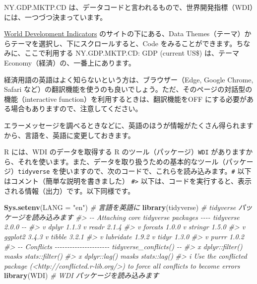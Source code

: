 \documentclass[
  xelatex, ja=standard]{bxjsbook}
\newenvironment{Shaded}{\begin{snugshade}}{\end{snugshade}}
\newcommand{\AttributeTok}[1]{\textcolor[rgb]{0.13,0.29,0.53}{#1}}
\newcommand{\CommentTok}[1]{\textcolor[rgb]{0.56,0.35,0.01}{\textit{#1}}}
\newcommand{\FunctionTok}[1]{\textcolor[rgb]{0.13,0.29,0.53}{\textbf{#1}}}
\newcommand{\NormalTok}[1]{#1}
\newcommand{\StringTok}[1]{\textcolor[rgb]{0.31,0.60,0.02}{#1}}
\theoremstyle{definition}
\theoremstyle{definition}
\theoremstyle{definition}
\theoremstyle{definition}
\theoremstyle{remark}
\begin{document}
NY.GDP.MKTP.CD は、データコードと言われるもので、世界開発指標（WDI）には、一つづつ決まっています。

\href{https://datatopics.worldbank.org/world-development-indicators/}{World Development Indicators} のサイトの下にある、Data Themes（テーマ）からテーマを選択し、下にスクロールすると、Code をみることができます。ちなみに、ここで利用する NY.GDP.MKTP.CD: GDP (current US\$) は、テーマ Economy（経済）の、一番上にあります。

経済用語の英語はよく知らないという方は、ブラウザー（Edge, Google Chrome, Safari など）の翻訳機能を使うのも良いでしょう。ただ、そのページの対話型の機能（interactive function）を利用するときは、翻訳機能をOFF にする必要がある場合もありますので、注意してください。

エラーメッセージを調べるときなどに、英語のほうが情報がたくさん得られますから、言語を、英語に変更しておきます。

R には、WDI のデータを取得する R のツール（パッケージ）\texttt{WDI} がありますから、それを使います。また、データを取り扱うための基本的なツール（パッケージ）\texttt{tidyverse} を使いますので、次のコードで、これらを読み込みます。\texttt{\#} 以下はコメント（簡単な説明を書きました） \texttt{\#\textgreater{}} 以下は、コードを実行すると、表示される情報（出力）です。以下同様です。

\begin{Shaded}
\begin{Highlighting}[]
\FunctionTok{Sys.setenv}\NormalTok{(}\AttributeTok{LANG =} \StringTok{"en"}\NormalTok{) }\CommentTok{\# 言語を英語に}
\FunctionTok{library}\NormalTok{(tidyverse)      }\CommentTok{\# tidyverse パッケージを読み込みます}
\CommentTok{\#\textgreater{} {-}{-} Attaching core tidyverse packages {-}{-}{-}{-} tidyverse 2.0.0 {-}{-}}
\CommentTok{\#\textgreater{} v dplyr     1.1.3     v readr     2.1.4}
\CommentTok{\#\textgreater{} v forcats   1.0.0     v stringr   1.5.0}
\CommentTok{\#\textgreater{} v ggplot2   3.4.3     v tibble    3.2.1}
\CommentTok{\#\textgreater{} v lubridate 1.9.2     v tidyr     1.3.0}
\CommentTok{\#\textgreater{} v purrr     1.0.2     }
\CommentTok{\#\textgreater{} {-}{-} Conflicts {-}{-}{-}{-}{-}{-}{-}{-}{-}{-}{-}{-}{-}{-}{-}{-}{-}{-}{-}{-}{-}{-} tidyverse\_conflicts() {-}{-}}
\CommentTok{\#\textgreater{} x dplyr::filter() masks stats::filter()}
\CommentTok{\#\textgreater{} x dplyr::lag()    masks stats::lag()}
\CommentTok{\#\textgreater{} i Use the conflicted package (\textless{}http://conflicted.r{-}lib.org/\textgreater{}) to force all conflicts to become errors}
\FunctionTok{library}\NormalTok{(WDI)            }\CommentTok{\# WDI パッケージを読み込みます}
\end{Highlighting}
\end{Shaded}
\end{document}
